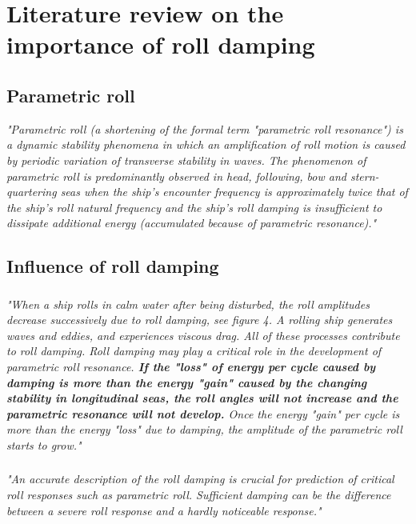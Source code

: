\section{Literature review on the importance of roll damping}

\subsection{Parametric roll}

\emph{"Parametric roll (a shortening of the formal term "parametric roll resonance") is a dynamic stability phenomena in which an amplification of roll motion is caused by periodic variation of transverse stability in waves. The phenomenon of parametric roll is predominantly observed in head, following, bow and stern-quartering seas when the ship's encounter frequency is approximately twice that of the ship's roll natural frequency and the ship's roll damping is insufficient to dissipate additional energy (accumulated because of parametric resonance)."} \parencite{imo_second_nodate}

\subsection{Influence of roll damping}
\subsubsection{}
\emph{"When a ship rolls in calm water after being disturbed, the roll amplitudes decrease successively due to roll damping, see figure 4. A rolling ship generates waves and eddies, and experiences viscous drag. All of these processes contribute to roll damping. Roll damping may play a critical role in the development of parametric roll resonance. \textbf{If the "loss" of energy per cycle caused by damping is more than the energy "gain" caused by the changing stability in longitudinal seas, the roll angles will not increase and the parametric resonance will not develop.} Once the energy "gain" per cycle is more than the energy "loss" due to damping, the amplitude of the parametric roll starts to grow."} \parencite{imo_second_nodate}

\subsubsection{}
\emph{"An accurate description of the roll damping is crucial for prediction of critical roll responses such as parametric roll. Sufficient damping can be the difference between a severe roll response and a hardly noticeable response."} \parencite{soder_ikeda_2019}
